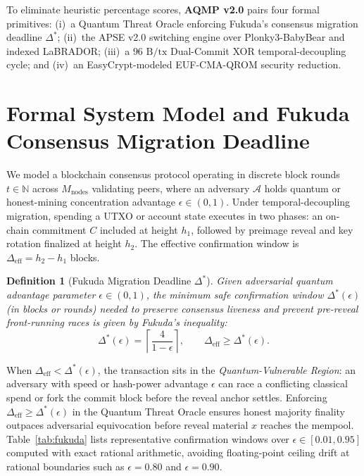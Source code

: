 \documentclass[conference,compsoc]{IEEEtran}
\newtheorem{definition}{Definition}
\begin{document}
To eliminate heuristic percentage scores, \textbf{AQMP v2.0} pairs four formal primitives: (i)~a Quantum Threat Oracle enforcing Fukuda's consensus migration deadline $\Delta^*$; (ii)~the APSE v2.0 switching engine over Plonky3-BabyBear and indexed LaBRADOR; (iii)~a $96\text{ B/tx}$ Dual-Commit XOR temporal-decoupling cycle; and (iv)~an EasyCrypt-modeled EUF-CMA-QROM security reduction.

\section{Formal System Model and Fukuda Consensus Migration Deadline}
\label{sec:fukuda}

We model a blockchain consensus protocol operating in discrete block rounds $t \in \mathbb{N}$ across $M_{\text{nodes}}$ validating peers, where an adversary $\mathcal{A}$ holds quantum or honest-mining concentration advantage $\epsilon \in (0, 1)$. Under temporal-decoupling migration, spending a UTXO or account state executes in two phases: an on-chain commitment $C$ included at height $h_1$, followed by preimage reveal and key rotation finalized at height $h_2$. The effective confirmation window is $\Delta_{\text{eff}} = h_2 - h_1$ blocks.

\begin{definition}[Fukuda Migration Deadline $\Delta^*$]
Given adversarial quantum advantage parameter $\epsilon \in (0, 1)$, the minimum safe confirmation window $\Delta^*(\epsilon)$ (in blocks or rounds) needed to preserve consensus liveness and prevent pre-reveal front-running races is given by Fukuda's inequality:
\begin{equation}
\label{eq:fukuda}
\Delta^*(\epsilon) = \left\lceil \frac{4}{1 - \epsilon} \right\rceil, \qquad \Delta_{\text{eff}} \ge \Delta^*(\epsilon).
\end{equation}
\end{definition}

When $\Delta_{\text{eff}} < \Delta^*(\epsilon)$, the transaction sits in the \emph{Quantum-Vulnerable Region}: an adversary with speed or hash-power advantage $\epsilon$ can race a conflicting classical spend or fork the commit block before the reveal anchor settles. Enforcing $\Delta_{\text{eff}} \ge \Delta^*(\epsilon)$ in the Quantum Threat Oracle ensures honest majority finality outpaces adversarial equivocation before reveal material $x$ reaches the mempool. Table~\ref{tab:fukuda} lists representative confirmation windows over $\epsilon \in [0.01, 0.95]$ computed with exact rational arithmetic, avoiding floating-point ceiling drift at rational boundaries such as $\epsilon = 0.80$ and $\epsilon = 0.90$.
\end{document}
